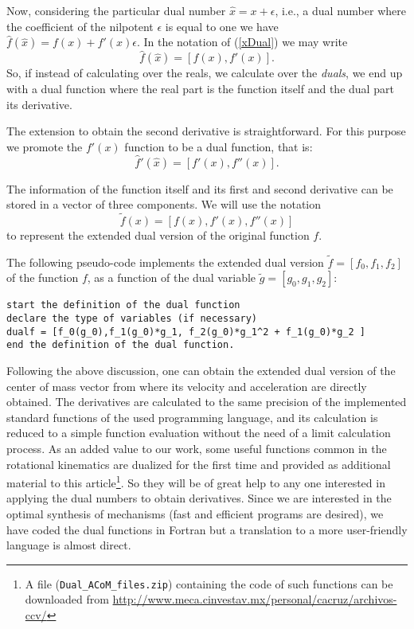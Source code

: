 \documentclass[11pt]{article}
\begin{document}
Now, considering the particular dual number $\hat{x}=x+\epsilon$, i.e., 
a dual number where the coefficient of the nilpotent $\epsilon$ is equal 
to one we have $ \hat{f}(\hat{x}) = f(x) + f'(x) \epsilon.$ In the 
notation of (\ref{xDual}) we may write
\begin{equation} \label{dfv}
\hat{f}(\hat{x}) = \left[ f(x),f'(x) \right].
\end{equation} 
So, if instead of calculating over the reals, we calculate over the 
\textit{duals}, we end up with a dual function where the real part is 
the function itself and the dual part its derivative. 

The extension to obtain the second derivative is straightforward. For 
this purpose we promote the $f'(x)$ function to be a 
dual function, that is:
\begin{equation}
 \hat{f}'(\hat{x})= \left[f'(x),f''(x) \right].
\end{equation}

The information of the function itself and its first and second 
derivative can be stored in a vector of three components.  We will use 
the notation 
\begin{equation}
\tilde{f}(x)=\left[f(x),f'(x),f''(x) \right ]
\end{equation}
to represent the extended dual version of the original function $f$.

The following pseudo-code implements the extended dual 
version $\tilde{f} =[f_0,f_1,f_2]$ of the function $f$, as a function of 
the dual variable $\tilde{g} = [g_0,g_1,g_2]$:

\begin{verbatim}
start the definition of the dual function 
declare the type of variables (if necessary)
dualf = [f_0(g_0),f_1(g_0)*g_1, f_2(g_0)*g_1^2 + f_1(g_0)*g_2 ]
end the definition of the dual function. 
\end{verbatim}
 
Following the above discussion, one can obtain the extended dual version 
of the center of mass vector from where its velocity and acceleration 
are  directly obtained. The derivatives are calculated to the same 
precision of the implemented standard functions of the used programming 
language, and its calculation is reduced to a simple function evaluation 
without the need of a limit calculation process. As an added value to 
our work, some useful functions common in the rotational kinematics are 
dualized for the first time and provided as additional material to this 
article\footnote{A file ({\tt Dual\_ACoM\_files.zip}) containing the 
code of such functions can be downloaded from 
\url{http://www.meca.cinvestav.mx/personal/cacruz/archivos-ccv/} }. 
So they will be of great help to any one interested in applying the dual 
numbers to obtain derivatives. Since we are interested in the optimal 
synthesis of mechanisms (fast and efficient programs are desired), we 
have coded the dual functions in Fortran but a translation to a more 
user-friendly language is almost direct. 
\end{document}
